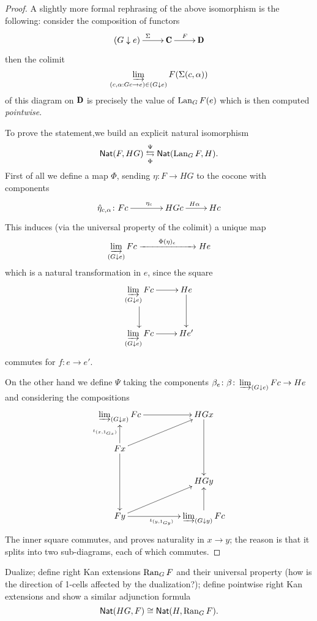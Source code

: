 \documentclass[a4paper,12pt]{amsart}
\begin{document}
\begin{proof}
A slightly more formal rephrasing of the above isomorphism is the following: consider the composition of functors
\[
\xymatrix{
	(G\downarrow e) \ar[r]^\Sigma & \C \ar[r]^F & \D
}
\]
then the colimit
\[
\varinjlim_{(c, \alpha : Gc \to e)\in(G\downarrow e)} F(\Sigma(c, \alpha))
\]
of this diagram on $\D$ is precisely the value of $\operatorname{Lan}_GF(e)$ which is then computed \emph{pointwise}.

To prove the statement,we build an explicit natural isomorphism
\[
\textsf{Nat}(F,HG)\overset{\Psi}{\underset{\Phi}\leftrightarrows} \textsf{Nat}(\operatorname{Lan}_GF,H).
\]
First of all we define a map $\Phi$, sending $\eta\colon F \to HG$ to the cocone with components
\[
\xymatrix{
	**[l] \hat{\eta}_{c,\alpha} \colon Fc \ar[r]^{\eta_c} & HGc \ar[r]^{H\alpha} & Hc
}
\]
This induces (via the universal property of the colimit) a unique map
\[
\varinjlim_{(G\downarrow e)} Fc \xrightarrow[]{\qquad \Phi(\eta)_e\qquad} He
\]
which is a natural transformation in $e$, since the square
\[
\xymatrix{
	\displaystyle \varinjlim_{(G\downarrow e)} Fc \ar[r]\ar[d]& He \ar[d]\\
	\displaystyle \varinjlim_{(G\downarrow e)} Fc \ar[r] & He'
}
\]
commutes for $f\colon e\to e'$.

On the other hand we define $\Psi$ taking the components $\beta_e \colon \beta\colon \varinjlim_{(G\downarrow e)} Fc \to He$ and considering the compositions
\[
\xymatrix@C=1.5cm{
	\varinjlim_{(G\downarrow x)} Fc \ar[r] & HGx \ar[dd]\\
	Fx\ar[dd]\ar[ur]\ar[u]^{\iota_{(x, 1_{Gx})}} & \\
	& HGy\\
	Fy \ar[ur] \ar[r]_{\iota_{(y, 1_{Gy})}}& \ar[u] \varinjlim_{(G\downarrow y)} Fc \\
}
\]
The inner square commutes, and proves naturality in $x\to y$; the reason is that it splits into two sub-diagrams, each of which commutes.
\end{proof}
\begin{exercise}
Dualize; define right Kan extensions $\operatorname{Ran}_GF$ and their universal property (how is the direction of 1-cells affected by the dualization?); define pointwise right Kan extensions and show a similar adjunction formula
\[
\textsf{Nat}(HG,F)\cong \textsf{Nat}(H, \operatorname{Ran}_GF).
\]
\end{exercise}
\end{document}
